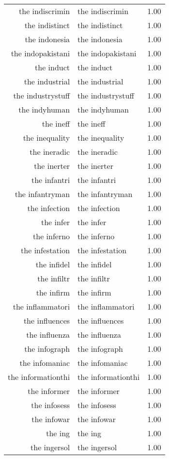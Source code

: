 \begin{table}[ht]
\begin{tabular}{rlr}
  the indiscrimin & the indiscrimin & 1.00 \\ 
  the indistinct & the indistinct & 1.00 \\ 
  the indonesia & the indonesia & 1.00 \\ 
  the indopakistani & the indopakistani & 1.00 \\ 
  the induct & the induct & 1.00 \\ 
  the industrial & the industrial & 1.00 \\ 
  the industrystuff & the industrystuff & 1.00 \\ 
  the indyhuman & the indyhuman & 1.00 \\ 
  the ineff & the ineff & 1.00 \\ 
  the inequality & the inequality & 1.00 \\ 
  the ineradic & the ineradic & 1.00 \\ 
  the inerter & the inerter & 1.00 \\ 
  the infantri & the infantri & 1.00 \\ 
  the infantryman & the infantryman & 1.00 \\ 
  the infection & the infection & 1.00 \\ 
  the infer & the infer & 1.00 \\ 
  the inferno & the inferno & 1.00 \\ 
  the infestation & the infestation & 1.00 \\ 
  the infidel & the infidel & 1.00 \\ 
  the infiltr & the infiltr & 1.00 \\ 
  the infirm & the infirm & 1.00 \\ 
  the inflammatori & the inflammatori & 1.00 \\ 
  the influences & the influences & 1.00 \\ 
  the influenza & the influenza & 1.00 \\ 
  the infograph & the infograph & 1.00 \\ 
  the infomaniac & the infomaniac & 1.00 \\ 
  the informationthi & the informationthi & 1.00 \\ 
  the informer & the informer & 1.00 \\ 
  the infosess & the infosess & 1.00 \\ 
  the infowar & the infowar & 1.00 \\ 
  the ing & the ing & 1.00 \\ 
  the ingersol & the ingersol & 1.00 \\ 

\end{tabular}
\end{table}
